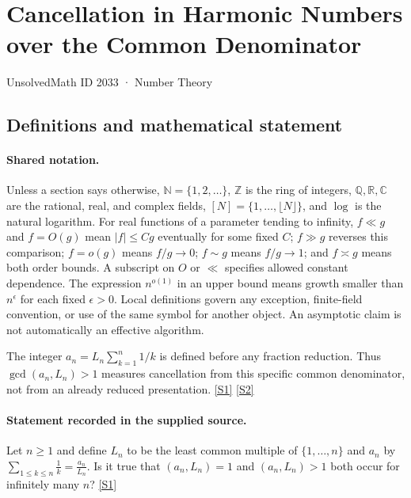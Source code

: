 \documentclass[11pt,a4paper]{article}
\newcommand{\N}{\mathbb{N}}
\newcommand{\Z}{\mathbb{Z}}
\newcommand{\Q}{\mathbb{Q}}
\newcommand{\R}{\mathbb{R}}
\newcommand{\C}{\mathbb{C}}
\newcommand{\sref}[2]{\hyperlink{source:#1:#2}{[S#2]}}
\begin{document}

\setcounter{section}{2032}

\section{Cancellation in Harmonic Numbers over the Common Denominator}\label{2033}

{\small\sffamily UnsolvedMath ID 2033 · Number Theory}

\subsection{Definitions and mathematical statement}

\paragraph{Shared notation.}Unless a section says otherwise, $\N=\{1,2,\ldots\}$,
$\Z$ is the ring of integers, $\Q,\R,\C$ are the rational, real, and complex
fields, $[N]=\{1,\ldots,\lfloor N\rfloor\}$, and $\log$ is the natural
logarithm. For real functions of a parameter tending to infinity,
$f\ll g$ and $f=O(g)$ mean $|f|\leq Cg$ eventually for some fixed $C$;
$f\gg g$ reverses this comparison; $f=o(g)$ means $f/g\to0$;
$f\sim g$ means $f/g\to1$; and $f\asymp g$ means both order bounds.
A subscript on $O$ or $\ll$ specifies allowed constant dependence.
The expression $n^{o(1)}$ in an upper bound means growth smaller than
$n^\epsilon$ for each fixed $\epsilon>0$. Local definitions govern any
exception, finite-field convention, or use of the same symbol for another
object. An asymptotic claim is not automatically an effective algorithm.



The integer $a_n=L_n\sum_{k=1}^n1/k$ is defined before any fraction reduction. Thus $\gcd(a_n,L_n)>1$ measures cancellation from this specific common denominator, not from an already reduced presentation. \sref{2033}{1} \sref{2033}{2}

\paragraph{Statement recorded in the supplied source.}
Let $n\geq 1$ and define $L_n$ to be the least common multiple of $\{1,\ldots,n\}$ and $a_n$ by $ \sum_{1\leq k\leq n}\frac{1}{k}=\frac{a_n}{L_n}. $ Is it true that $(a_n,L_n)=1$ and $(a_n,L_n)>1$ both occur for infinitely many $n$? \sref{2033}{1}
\end{document}
